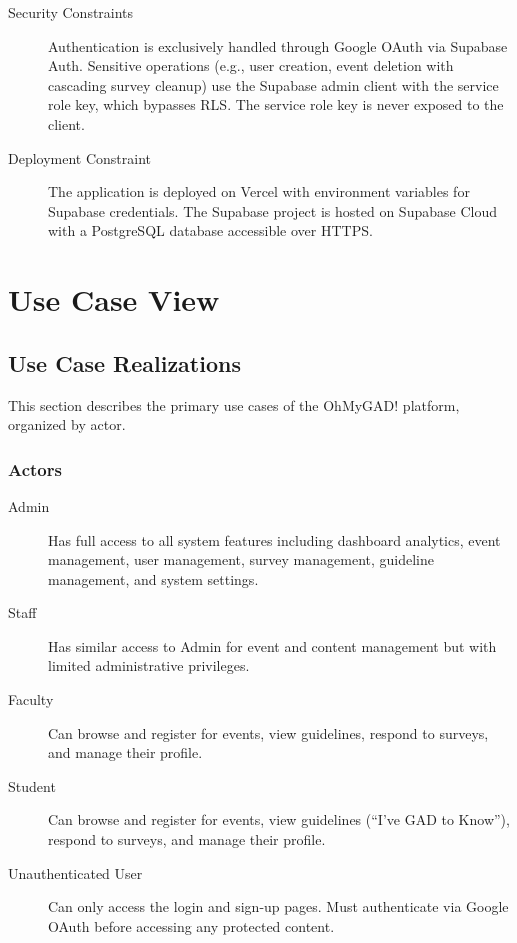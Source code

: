 \documentclass[11pt,a4paper]{article}
\begin{document}
\begin{description}
  \item[Security Constraints]
    Authentication is exclusively handled through Google OAuth via Supabase Auth. Sensitive operations (e.g., user creation, event deletion with cascading survey cleanup) use the Supabase admin client with the service role key, which bypasses RLS. The service role key is never exposed to the client.

  \item[Deployment Constraint]
    The application is deployed on Vercel with environment variables for Supabase credentials. The Supabase project is hosted on Supabase Cloud with a PostgreSQL database accessible over HTTPS.
\end{description}


\section{Use Case View}
\label{sec:use_case_view}

\subsection{Use Case Realizations}

This section describes the primary use cases of the OhMyGAD! platform, organized by actor.

\subsubsection{Actors}

\begin{description}
  \item[Admin] Has full access to all system features including dashboard analytics, event management, user management, survey management, guideline management, and system settings.
  \item[Staff] Has similar access to Admin for event and content management but with limited administrative privileges.
  \item[Faculty] Can browse and register for events, view guidelines, respond to surveys, and manage their profile.
  \item[Student] Can browse and register for events, view guidelines (``I've GAD to Know''), respond to surveys, and manage their profile.
  \item[Unauthenticated User] Can only access the login and sign-up pages. Must authenticate via Google OAuth before accessing any protected content.
\end{description}
\end{document}

